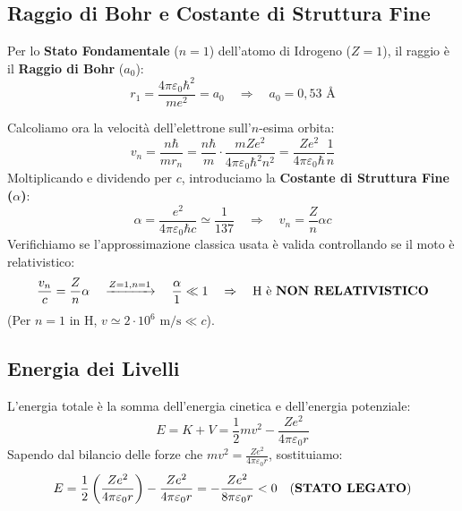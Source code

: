 \documentclass[11pt, a4paper]{article}
\begin{document}
\subsection{Raggio di Bohr e Costante di Struttura Fine} %

Per lo \textbf{Stato Fondamentale} ($n=1$) dell'atomo di Idrogeno ($Z=1$), il raggio è il \textbf{Raggio di Bohr} ($a_0$): %
\begin{equation}
    r_1 = \frac{4\pi\varepsilon_0 \hbar^2}{m e^2} = a_0 \quad \Rightarrow \quad \boxed{ a_0 = 0,53 \text{ \AA} } %
\end{equation}

\noindent
Calcoliamo ora la velocità dell'elettrone sull'$n$-esima orbita: %
\begin{equation*}
    v_n = \frac{n\hbar}{m r_n} = \frac{n\hbar}{m} \cdot \frac{m Z e^2}{4\pi\varepsilon_0 \hbar^2 n^2} = \frac{Z e^2}{4\pi\varepsilon_0 \hbar} \frac{1}{n} %
\end{equation*}
Moltiplicando e dividendo per $c$, introduciamo la \textbf{Costante di Struttura Fine ($\alpha$)}: %
\begin{equation}
    \boxed{ \alpha = \frac{e^2}{4\pi\varepsilon_0 \hbar c} \simeq \frac{1}{137} } \quad \Rightarrow \quad v_n = \frac{Z}{n} \alpha c %
\end{equation}
Verifichiamo se l'approssimazione classica usata è valida controllando se il moto è relativistico: %
\begin{equation*}
    \frac{v_n}{c} = \frac{Z}{n} \alpha \quad \xrightarrow{Z=1, n=1} \quad \frac{\alpha}{1} \ll 1 \quad \Rightarrow \quad \text{H è \textbf{NON RELATIVISTICO}} %
\end{equation*}
(Per $n=1$ in H, $v \simeq 2 \cdot 10^6 \text{ m/s} \ll c$). %

\subsection{Energia dei Livelli} %

L'energia totale è la somma dell'energia cinetica e dell'energia potenziale: %
\begin{equation*}
    E = K + V = \frac{1}{2}mv^2 - \frac{Z e^2}{4\pi\varepsilon_0 r} %
\end{equation*}
Sapendo dal bilancio delle forze che $mv^2 = \frac{Z e^2}{4\pi\varepsilon_0 r}$, sostituiamo: %
\begin{equation}
    E = \frac{1}{2}\left(\frac{Z e^2}{4\pi\varepsilon_0 r}\right) - \frac{Z e^2}{4\pi\varepsilon_0 r} = -\frac{Z e^2}{8\pi\varepsilon_0 r} < 0 \quad \text{(\textbf{STATO LEGATO})} %
\end{equation}
\end{document}
